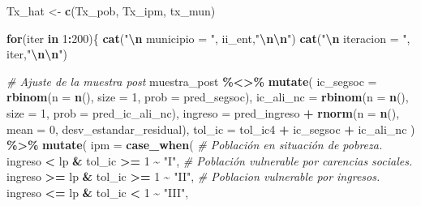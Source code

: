 \documentclass[
  12pt,
]{book}
\newenvironment{Shaded}{\begin{snugshade}}{\end{snugshade}}
\newcommand{\AttributeTok}[1]{\textcolor[rgb]{0.13,0.29,0.53}{#1}}
\newcommand{\CommentTok}[1]{\textcolor[rgb]{0.56,0.35,0.01}{\textit{#1}}}
\newcommand{\ControlFlowTok}[1]{\textcolor[rgb]{0.13,0.29,0.53}{\textbf{#1}}}
\newcommand{\DecValTok}[1]{\textcolor[rgb]{0.00,0.00,0.81}{#1}}
\newcommand{\FunctionTok}[1]{\textcolor[rgb]{0.13,0.29,0.53}{\textbf{#1}}}
\newcommand{\NormalTok}[1]{#1}
\newcommand{\OtherTok}[1]{\textcolor[rgb]{0.56,0.35,0.01}{#1}}
\newcommand{\SpecialCharTok}[1]{\textcolor[rgb]{0.81,0.36,0.00}{\textbf{#1}}}
\newcommand{\StringTok}[1]{\textcolor[rgb]{0.31,0.60,0.02}{#1}}
\begin{document}
\begin{Shaded}
\begin{Highlighting}[]
\NormalTok{  Tx\_hat }\OtherTok{\textless{}{-}} \FunctionTok{c}\NormalTok{(Tx\_pob, Tx\_ipm, tx\_mun)}

  \ControlFlowTok{for}\NormalTok{(iter }\ControlFlowTok{in} \DecValTok{1}\SpecialCharTok{:}\DecValTok{200}\NormalTok{)\{}
    \FunctionTok{cat}\NormalTok{(}\StringTok{"}\SpecialCharTok{\textbackslash{}n}\StringTok{ municipio = "}\NormalTok{, ii\_ent,}\StringTok{"}\SpecialCharTok{\textbackslash{}n\textbackslash{}n}\StringTok{"}\NormalTok{)}
    \FunctionTok{cat}\NormalTok{(}\StringTok{"}\SpecialCharTok{\textbackslash{}n}\StringTok{ iteracion = "}\NormalTok{, iter,}\StringTok{"}\SpecialCharTok{\textbackslash{}n\textbackslash{}n}\StringTok{"}\NormalTok{)}

    \CommentTok{\# Ajuste de la muestra post}
\NormalTok{    muestra\_post }\SpecialCharTok{\%\textless{}\textgreater{}\%} 
      \FunctionTok{mutate}\NormalTok{(}
        \AttributeTok{ic\_segsoc =} \FunctionTok{rbinom}\NormalTok{(}\AttributeTok{n =} \FunctionTok{n}\NormalTok{(), }\AttributeTok{size =} \DecValTok{1}\NormalTok{, }\AttributeTok{prob =}\NormalTok{ pred\_segsoc),}
        \AttributeTok{ic\_ali\_nc =} \FunctionTok{rbinom}\NormalTok{(}\AttributeTok{n =} \FunctionTok{n}\NormalTok{(), }\AttributeTok{size =} \DecValTok{1}\NormalTok{, }\AttributeTok{prob =}\NormalTok{ pred\_ic\_ali\_nc),}
        \AttributeTok{ingreso =}\NormalTok{ pred\_ingreso }\SpecialCharTok{+} \FunctionTok{rnorm}\NormalTok{(}\AttributeTok{n =} \FunctionTok{n}\NormalTok{(), }\AttributeTok{mean =} \DecValTok{0}\NormalTok{, desv\_estandar\_residual),}
        \AttributeTok{tol\_ic =}\NormalTok{ tol\_ic4 }\SpecialCharTok{+}\NormalTok{ ic\_segsoc }\SpecialCharTok{+}\NormalTok{ ic\_ali\_nc}
\NormalTok{      ) }\SpecialCharTok{\%\textgreater{}\%} \FunctionTok{mutate}\NormalTok{(}
        \AttributeTok{ipm   =} \FunctionTok{case\_when}\NormalTok{(}
          \CommentTok{\# Población en situación de pobreza.}
\NormalTok{          ingreso }\SpecialCharTok{\textless{}}\NormalTok{ lp  }\SpecialCharTok{\&}\NormalTok{  tol\_ic }\SpecialCharTok{\textgreater{}=} \DecValTok{1} \SpecialCharTok{\textasciitilde{}} \StringTok{"I"}\NormalTok{,}
          \CommentTok{\# Población vulnerable por carencias sociales.}
\NormalTok{          ingreso }\SpecialCharTok{\textgreater{}=}\NormalTok{ lp }\SpecialCharTok{\&}\NormalTok{ tol\_ic }\SpecialCharTok{\textgreater{}=} \DecValTok{1} \SpecialCharTok{\textasciitilde{}} \StringTok{"II"}\NormalTok{,}
          \CommentTok{\# Poblacion vulnerable por ingresos.}
\NormalTok{          ingreso }\SpecialCharTok{\textless{}=}\NormalTok{ lp }\SpecialCharTok{\&}\NormalTok{ tol\_ic }\SpecialCharTok{\textless{}} \DecValTok{1} \SpecialCharTok{\textasciitilde{}} \StringTok{"III"}\NormalTok{,}

\end{Highlighting}
\end{Shaded}
\end{document}
